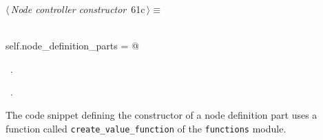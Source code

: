 \documentclass[
    a4paper,      %
    10pt,         %
    openright,    %
    notitlepage,  %
    parskip=half, %
]{scrreprt}       %
\theoremstyle{definition}                    %
\begin{document}
\begin{flushleft} \small
\begin{minipage}{\linewidth}\label{scrap102}\raggedright\small
{} $\langle\,${\itshape Node controller constructor}\nobreak\ {\footnotesize {61c}}$\,\rangle\equiv$
\vspace{-1exm}
\begin{list}{}{} \item
\mbox{}\lstinline@@\\
\mbox{}\lstinline@    self.node_definition_parts = {}@\\
\mbox{}\lstinline@@{\NWsep}
\end{list}
\vspace{-1.5ex}
\footnotesize
\begin{list}{}{\setlength{\itemsep}{-\parsep}\setlength{\itemindent}{-\leftmargin}}
\item \NWtxtMacroDefBy\ .
\item \NWtxtMacroRefIn\ .

\item{}
\end{list}
\end{minipage}\vspace{4ex}
\end{flushleft}
The code snippet defining the constructor of a node definition part uses a
function called \verb+create_value_function+ of the \verb+functions+ module.
\end{document}
